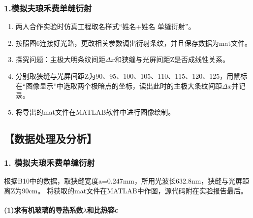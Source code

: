 \documentclass[12pt,a4paper,UTF8,fontset=fandol]{ctexart}
\begin{document}
	\subsubsection*{1.模拟夫琅禾费单缝衍射}
	\begin{enumerate}[(1)]
			\item 两人合作实验时仿真工程取名样式“姓名+姓名 单缝衍射”。
			\item 按照图6连接好光路，更改相关参数调出衍射条纹，并且保存数据为mat文件。
			\item 探究问题：主极大明条纹间距$\Delta x$和狭缝与光屏间距Z是否成线性关系。
			\item 分别取狭缝与光屏间距Z为90、95、100、105、110、115、120、125，用鼠标在“图像显示”中选取两个极暗点的坐标，读出此时的主极大条纹间距$\Delta x$并记录。
			\item 将导出的mat文件在MATLAB软件中进行图像绘制。
	\end{enumerate}


\subsection*{【数据处理及分析】}
	\subsubsection*{1. 模拟夫琅禾费单缝衍射}
	根据B10中的数据，取狭缝宽度a=0.247mm，所用光波长632.8nm，狭缝与光屏距离Z为90cm。
	将获取的mat文件在MATLAB中作图，源代码附在实验报告最后。

	\paragraph{(1)求有机玻璃的导热系数$\lambda$和比热容c}

\end{document}
